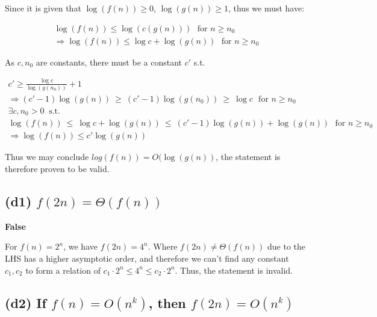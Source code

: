 \documentclass[12pt]{article}
\begin{document}
Since it is given that $\log(f(n))\geq 0$, $\log(g(n)) \geq 1 $, thus we must have:

\begin{gather}
    \log(f(n)) \leq \log(c(g(n))) \ \ \ \text{for $n \geq n_{0}$} \nonumber\\
    \Rightarrow \log(f(n)) \leq \log c + \log(g(n)) \ \ \ \text{for $n \geq n_{0}$}
\end{gather}

As $c, n_{0}$ are constants, there must be a constant $c'$ s.t.


\begin{gather}
    c' \geq \frac{\log c}{\log (g(n_{0}))} + 1 \\
    \Rightarrow (c' -1)\log (g(n))  \ \geq \ (c' -1)\log (g(n_{0})) \ \geq \ \log c \ \ \ \text{for $n \geq n_{0}$} \\
    \exists c, n_{0} > 0 \nonumber \ \text{ s.t. } \  \\
    \log(f(n)) \ \leq \ \log c + \log(g(n)) \ \leq \  (c' -1)\log (g(n)) + \log(g(n))\ \ \ \text{for $n \geq n_{0}$} \\
    \Rightarrow \log(f(n))  \leq c'\log (g(n))
\end{gather}

Thus we may conclude $log(f(n)) = O(\log(g(n))$, the statement is therefore proven to be valid.


\subsection{(d1) $f(2n) = \Theta(f(n))$}

\textbf{False}

For $f(n) = 2^n$, we have $f(2n) = 4^n$. Where $f(2n) \neq \Theta(f(n))$ due to the LHS has a higher asymptotic order, and therefore we can't find any constant $c_{1}, c_{2}$ to form a relation of $c_1 \cdot 2^n \leq 4^n \leq c_2 \cdot 2^n$. Thus, the statement is invalid.


\subsection{(d2) If $f(n) = O(n^k)$, then $f(2n) = O(n^k)$}
\end{document}
